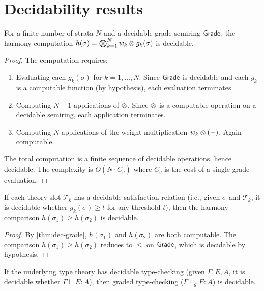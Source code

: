 \section{Decidability results}
\label{sec:decidability}

\begin{theorem}
\label{thm:dec-grade}
For a finite number of strata $N$ and a decidable grade semiring
$\mathsf{Grade}$, the harmony computation
$h(\sigma) = \bigotimes_{k=1}^{N} w_k \otimes g_k(\sigma)$
is decidable.
\end{theorem}

\begin{proof}
The computation requires:
\begin{enumerate}[label=(\arabic*),nosep]
\item Evaluating each $g_k(\sigma)$ for $k = 1, \ldots, N$.  Since
  $\mathsf{Grade}$ is decidable and each $g_k$ is a computable function (by
  hypothesis), each evaluation terminates.
\item Computing $N - 1$ applications of $\otimes$.  Since $\otimes$ is a
  computable operation on a decidable semiring, each application
  terminates.
\item Computing $N$ applications of the weight multiplication
  $w_k \otimes (-)$.  Again computable.
\end{enumerate}
The total computation is a finite sequence of decidable operations,
hence decidable.  The complexity is $O(N \cdot C_g)$ where $C_g$ is
the cost of a single grade evaluation.
\end{proof}

\begin{theorem}
\label{thm:dec-harmony}
If each theory slot $\mathcal{T}_k$ has a decidable satisfaction
relation (i.e., given $\sigma$ and $\mathcal{T}_k$, it is decidable
whether $g_k(\sigma) \geq t$ for any threshold $t$), then the harmony
comparison $h(\sigma_1) \geq h(\sigma_2)$ is decidable.
\end{theorem}

\begin{proof}
By \cref{thm:dec-grade}, $h(\sigma_1)$ and $h(\sigma_2)$ are both
computable.  The comparison $h(\sigma_1) \geq h(\sigma_2)$ reduces to
$\leq$ on $\mathsf{Grade}$, which is decidable by hypothesis.
\end{proof}

\begin{theorem}
\label{thm:dec-typecheck}
If the underlying type theory has decidable type-checking (given
$\Gamma, E, A$, it is decidable whether $\Gamma \vdash E : A$),
then graded type-checking ($\Gamma \vdash_g E : A$) is decidable.
\end{theorem}

